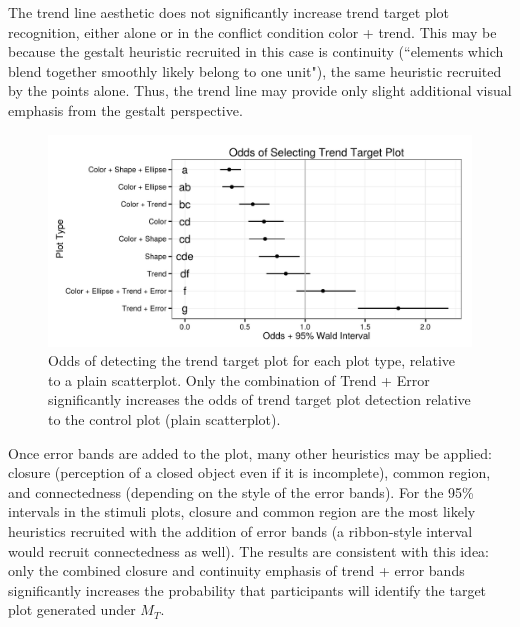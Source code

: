 \documentclass[11pt]{isuthesis}\usepackage[]{graphicx}\usepackage[]{color}
\newenvironment{knitrout}{}{} %
\begin{document}
The trend line aesthetic does not significantly increase trend target plot recognition, either alone or in the conflict condition color + trend. This may be because the gestalt heuristic recruited in this case is continuity (``elements which blend together smoothly likely belong to one unit"), the same heuristic recruited by the points alone. Thus, the trend line may provide only slight additional visual emphasis from the gestalt perspective.

\begin{figure}[htbp]\centering
\begin{knitrout}
\color{fgcolor}

{\centering \includegraphics[width=.75\linewidth]{Figure/FeatureHierarchy/fig-line-fixef-1} 

}



\end{knitrout}
\caption[Odds of detecting the trend target plot for each plot type]{Odds of detecting the trend target plot for each  plot type, relative to a plain scatterplot. Only the combination of Trend + Error significantly increases the odds of trend target plot detection relative to the control plot (plain scatterplot). \label{fig:linear.fixef}}
\end{figure}

Once error bands are added to the plot, many other heuristics may be applied: closure (perception of a closed object even if it is incomplete), common region, and connectedness (depending on the style of the error bands). For the 95\% intervals in the stimuli plots, closure and common region are the most likely heuristics recruited with the addition of error bands (a ribbon-style interval would recruit connectedness as well). The results are consistent with this idea: only the combined closure and continuity emphasis of trend + error bands significantly increases the probability that participants will identify the target plot generated under $M_T$. 
\end{document}
